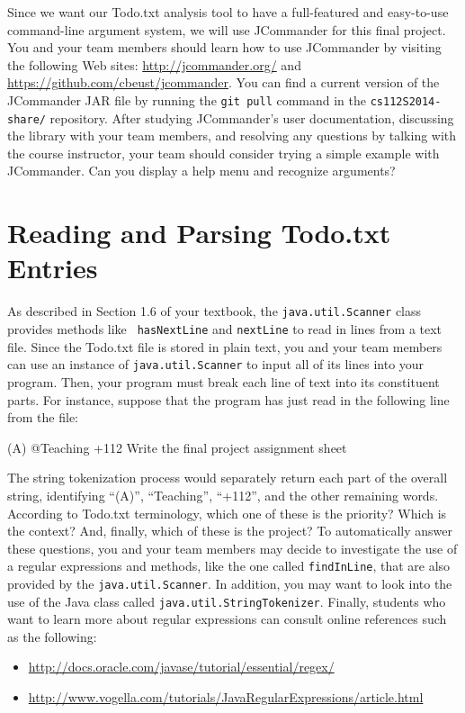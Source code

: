 Since we want our Todo.txt analysis tool to have a full-featured and easy-to-use command-line argument system, we will
use JCommander for this final project.  You and your team members should learn how to use JCommander by visiting the
following Web sites: \url{http://jcommander.org/} and \url{https://github.com/cbeust/jcommander}. You can find a current
version of the JCommander JAR file by running the {\tt git pull} command in the {\tt cs112S2014-share/} repository.
After studying JCommander's user documentation, discussing the library with your team members, and resolving any
questions by talking with the course instructor, your team should consider trying a simple example with JCommander. Can
you display a help menu and recognize arguments?

\section*{Reading and Parsing Todo.txt Entries}

  As described in Section 1.6 of your textbook, the {\tt java.util.Scanner} class provides methods like {\tt
  hasNextLine} and {\tt nextLine} to read in lines from a text file.  Since the Todo.txt file is stored in plain text,
  you and your team members can use an instance of {\tt java.util.Scanner} to input all of its lines into your program.
  Then, your program must break each line of text into its constituent parts.  For instance, suppose that the program
  has just read in the following line from the file:

  (A) @Teaching +112 Write the final project assignment sheet

  The string tokenization process would separately return each part of the overall string, identifying ``(A)'',
  ``Teaching'', ``+112'', and the other remaining words. According to Todo.txt terminology, which one of these is the
  priority?  Which is the context?  And, finally, which of these is the project?  To automatically answer these
  questions, you and your team members may decide to investigate the use of a regular expressions and methods, like the
  one called {\tt findInLine}, that are also provided by the {\tt java.util.Scanner}. In addition, you may want to
  look into the use of the Java class called {\tt java.util.StringTokenizer}. Finally, students who want to learn more
  about regular expressions can consult online references such as the following:

  \vspace*{-.25in}
  \begin{itemize}
    \itemsep0in
    \item \url{http://docs.oracle.com/javase/tutorial/essential/regex/}
    \item \url{http://www.vogella.com/tutorials/JavaRegularExpressions/article.html}
  \end{itemize}

